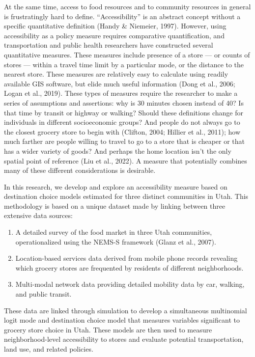 \documentclass[
  letterpaper,
  number,
  review,
  3p]{elsarticle}
\providecommand{\tightlist}{%
  \setlength{\itemsep}{0pt}\setlength{\parskip}{0pt}}\usepackage{longtable,booktabs,array}
\begin{document}
At the same time, access to food resources and to community resources in
general is frustratingly hard to define. ``Accessibility'' is an
abstract concept without a specific quantitative definition (Handy \&
Niemeier, 1997). However, using accessibility as a policy measure
requires comparative quantification, and transportation and public
health researchers have constructed several quantitative measures. These
measures include presence of a store --- or counts of stores --- within
a travel time limit by a particular mode, or the distance to the nearest
store. These measures are relatively easy to calculate using readily
available GIS software, but elide much useful information (Dong et al.,
2006; Logan et al., 2019). These types of measures require the
researcher to make a series of assumptions and assertions: why is 30
minutes chosen instead of 40? Is that time by transit or highway or
walking? Should these definitions change for individuals in different
socioeconomic groups? And people do not always go to the closest grocery
store to begin with (Clifton, 2004; Hillier et al., 2011); how much
farther are people willing to travel to go to a store that is cheaper or
that has a wider variety of goods? And perhaps the home location isn't
the only spatial point of reference (Liu et al., 2022). A measure that
potentially combines many of these different considerations is
desirable.

In this research, we develop and explore an accessibility measure based
on destination choice models estimated for three distinct communities in
Utah. This methodology is based on a unique dataset made by linking
between three extensive data sources:

\begin{enumerate}
\def\labelenumi{\arabic{enumi}.}
\tightlist
\item
  A detailed survey of the food market in three Utah communities,
  operationalized using the NEMS-S framework (Glanz et al., 2007).
\item
  Location-based services data derived from mobile phone records
  revealing which grocery stores are frequented by residents of
  different neighborhoods.
\item
  Multi-modal network data providing detailed mobility data by car,
  walking, and public transit.
\end{enumerate}

These data are linked through simulation to develop a simultaneous
multinomial logit mode and destination choice model that measures
variables significant to grocery store choice in Utah. These models are
then used to measure neighborhood-level accessibility to stores and
evaluate potential transportation, land use, and related policies.
\end{document}
